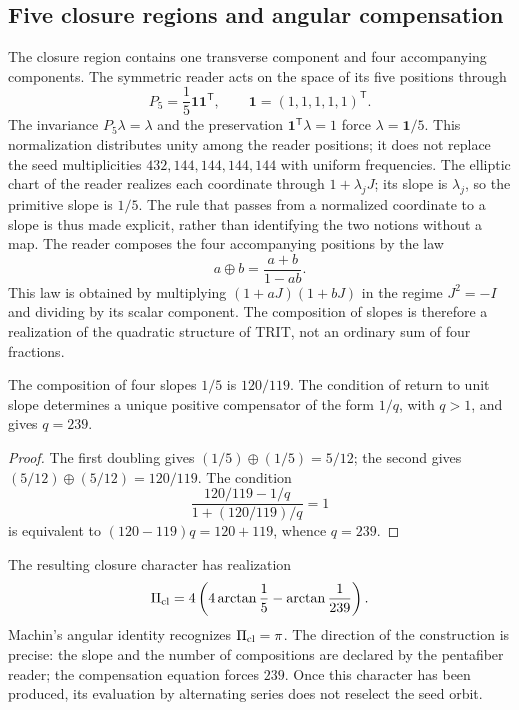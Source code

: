 \subsection{Five closure regions and angular compensation}

The closure region contains one transverse component and four accompanying components. The symmetric reader acts on the space of its five positions through
\[
 P_5=\frac15\mathbf1\mathbf1^{\mathsf T},\qquad
 \mathbf1=(1,1,1,1,1)^{\mathsf T}.
\]
The invariance \(P_5\lambda=\lambda\) and the preservation \(\mathbf1^{\mathsf T}\lambda=1\) force \(\lambda=\mathbf1/5\). This normalization distributes unity among the reader positions; it does not replace the seed multiplicities \(432,144,144,144,144\) with uniform frequencies. The elliptic chart of the reader realizes each coordinate through \(1+\lambda_jJ\); its slope is \(\lambda_j\), so the primitive slope is \(1/5\). The rule that passes from a normalized coordinate to a slope is thus made explicit, rather than identifying the two notions without a map. The reader composes the four accompanying positions by the law
\begin{equation}
 a\oplus b=\frac{a+b}{1-ab}.
 \label{eq:suma-pendientes}
\end{equation}
This law is obtained by multiplying \((1+aJ)(1+bJ)\) in the regime \(J^2=-I\) and dividing by its scalar component. The composition of slopes is therefore a realization of the quadratic structure of TRIT, not an ordinary sum of four fractions.

\begin{proposition}
The composition of four slopes \(1/5\) is \(120/119\). The condition of return to unit slope determines a unique positive compensator of the form \(1/q\), with \(q>1\), and gives \(q=239\).
\end{proposition}
\begin{proof}
The first doubling gives \((1/5)\oplus(1/5)=5/12\); the second gives \((5/12)\oplus(5/12)=120/119\). The condition
\[
 \frac{120/119-1/q}{1+(120/119)/q}=1
\]
is equivalent to \((120-119)q=120+119\), whence \(q=239\).
\end{proof}

The resulting closure character has realization
\begin{equation}
 \Pi_{\rm cl}=4\left(4\arctan\frac15-\arctan\frac1{239}\right).
 \label{eq:lector-pi}
\end{equation}
Machin's angular identity recognizes \(\Pi_{\rm cl}=\pi\). The direction of the construction is precise: the slope and the number of compositions are declared by the pentafiber reader; the compensation equation forces \(239\). Once this character has been produced, its evaluation by alternating series does not reselect the seed orbit.

